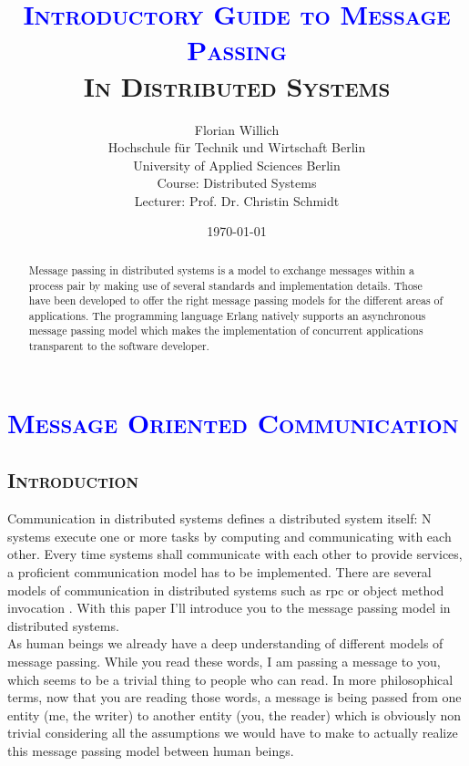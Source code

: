 \documentclass[xcolor=dvipsnames]{article}
\title{\scshape{\textbf{\textcolor{blue}{Introductory Guide to Message Passing}}\\In Distributed Systems}}
\author{Florian Willich \\ Hochschule f\"ur Technik und Wirtschaft Berlin \\ University of Applied Sciences Berlin \\ Course: Distributed Systems \\ Lecturer: Prof. Dr. Christin Schmidt}
\date{\today}
\begin{document}
\maketitle

\begin{abstract}

Message passing in distributed systems is a model to exchange messages within a process pair by making use of several standards and implementation details. Those have been developed to offer the right message passing models for the different areas of applications. The programming language Erlang natively supports an asynchronous message passing model which makes the implementation of concurrent applications transparent to the software developer.

\end{abstract}

\tableofcontents

\newpage

\section{\scshape{\textcolor{blue}{Message Oriented Communication}}} \label{introduction}

\subsection{\scshape{Introduction}}

Communication in distributed systems defines a distributed system itself: N systems execute one or more tasks by computing and communicating with each other. Every time systems shall communicate with each other to provide services, a proficient communication model has to be implemented. There are several models of communication in distributed systems such as \gls{rpc} or object method invocation \cite[chap. 4.3 / p. 203]{tanenbaum}. With this paper I'll introduce you to the message passing model in distributed systems.\\

\noindent As human beings we already have a deep understanding of different models of message passing. While you read these words, I am passing a message to you, which seems to be a trivial thing to people who can read. In more philosophical terms, now that you are reading those words, a message is being passed from one entity (me, the writer) to another entity (you, the reader) which is obviously non trivial considering all the assumptions we would have to make to actually realize this message passing model between human beings.\\
\end{document}
